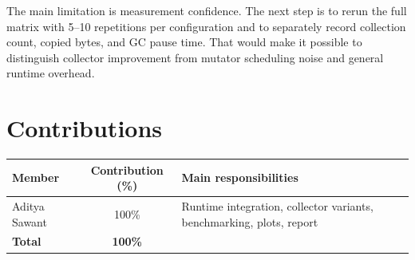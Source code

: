 \documentclass[11pt,a4paper]{article}
\begin{document}
The main limitation is measurement confidence. The next step is to rerun the
full matrix with 5--10 repetitions per configuration and to separately record
collection count, copied bytes, and GC pause time. That would make it possible
to distinguish collector improvement from mutator scheduling noise and general
runtime overhead.

\section*{Contributions}
\label{sec:contributions}

\begin{center}
\begin{tabular}{@{}lcl@{}}
\toprule
\textbf{Member} & \textbf{Contribution (\%)} & \textbf{Main responsibilities} \\
\midrule
Aditya Sawant & 100\% & Runtime integration, collector variants, benchmarking, plots, report \\
\midrule
\textbf{Total} & \textbf{100\%} & \\
\bottomrule
\end{tabular}
\end{center}



\end{document}
